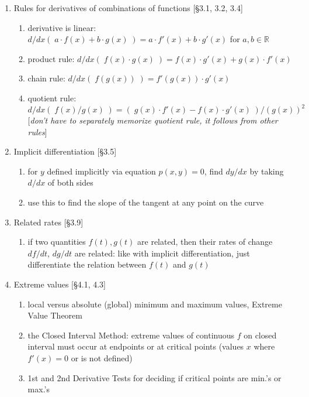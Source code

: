 \documentclass[11pt]{article}
\begin{document}
\begin{enumerate}
\item Rules for derivatives of combinations of functions [\S 3.1, 3.2, 3.4]
\begin{enumerate}
\item derivative is linear: $d/dx( \; a\cdot f(x) + b\cdot g(x) \;) = a \cdot f'(x) + b \cdot g'(x)$ for $a,b \in \mathbb{R}$
\item product rule: $d/dx( \; f(x)\cdot g(x) \;) = f(x) \cdot g'(x) + g(x) \cdot f'(x)$
\item chain rule: $d/dx (\; f(g(x)) \; ) = f'(g(x)) \cdot g'(x)$
\item quotient rule: $\displaystyle d/dx (\; f(x)/g(x) \;) = (\; g(x)\cdot f'(x) - f(x)\cdot g'(x) \; )/(g(x))^2$\\ {[\emph{don't have to separately memorize quotient rule, it follows from other rules}]}
\end{enumerate}

\item Implicit differentiation [\S 3.5]
\begin{enumerate}
\item for $y$ defined implicitly via equation $p(x,y)=0$, find $dy/dx$ by taking $d/dx$ of both sides
\item use this to find the slope of the tangent at any point on the curve
\end{enumerate}

\item Related rates [\S 3.9]
\begin{enumerate}
\item if two quantities $f(t), g(t)$ are related, then their rates of change $df/dt$, $dg/dt$ are related: like with implicit differentiation, just differentiate the relation between $f(t)$ and $g(t)$
\end{enumerate}

\item Extreme values [\S 4.1, 4.3]
\begin{enumerate}
\item local versus absolute (global) minimum and maximum values, Extreme Value Theorem
\item the Closed Interval Method: extreme values of continuous $f$ on closed interval must occur at endpoints or at critical points (values $x$ where $f'(x)=0$ or is not defined)
\item 1st and 2nd Derivative Tests for deciding if critical points are min.'s or max.'s
\end{enumerate}


\end{enumerate}
\end{document}
